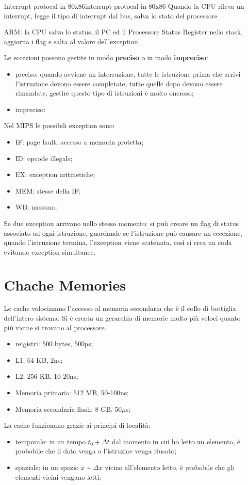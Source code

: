 \documentclass[12pt]{article}
\begin{document}
\begin{example}{Interrupt protocal in 80x86}{interrupt-protocal-in-80x86}
    Quando la CPU rileva un interrupt, legge il tipo di interrupt dal bus, salva lo stato del processore
\end{example}

ARM: la CPU salva lo status, il PC ed il Processore Status Register nello stack, aggiorna i flag e salta al valore dell'exception

Le eccezioni possono gestite in modo \textbf{preciso} o in modo \textbf{impreciso}:
\begin{itemize}
    \item preciso: quando avviene un interruzione, tutte le istruzione prima che arrivi l'istruzione devono essere completate, tutte quelle dopo devono essere rimandate, gestire questo tipo di istruzioni \`e molto oneroso;
    \item impreciso: 
\end{itemize}

Nel MIPS le possibili exception sono:
\begin{itemize}
    \item IF: page fault, accesso a memoria protetta;
    \item ID: opcode illegale;
    \item EX: exception aritmetiche;
    \item MEM: stesse della IF;
    \item WB: nussuna;
\end{itemize}
Se due exception arrivano nello stesso momento: si pu\`u creare un flag di status associato ad ogni istruzione, guardande se l'istruzione pu\`o causare un eccezione, quando l'istruzione termina, l'exception viene scatenata, cos\`i si crea un coda evitando exception simultanee.


\section{Chache Memories}
Le cache volocizzano l'accesso al memoria secondaria che \`e il collo di bottiglia dell'intero sistema. Si \`e creata un gerarchia di memorie molto pi\`u veloci quanto pi\`u vicine si trovano al processore.
\begin{itemize}
    \item reigistri: 500 bytes, 500ps;
    \item L1: 64 KB, 2ns;
    \item L2: 256 KB, 10-20ns;
    \item Memoria primaria: 512 MB, 50-100ns;
    \item Memoria secondaria flash: 8 GB, 50$\mu$s;
\end{itemize}
La cache funzionano grazie ai principi di localit\`a:
\begin{itemize}
    \item temporale: in un tempo $t_0 + \Delta t$ dal momento in cui ho letto un elemento, \`e probabile che il dato venga o l'istruzioe venga riusato;
    \item spaziale: in un spazio $x + \Delta x$ vicino all'elemento letto, \`e probabile che gli elementi vicini vengano letti;
\end{itemize}
\end{document}
